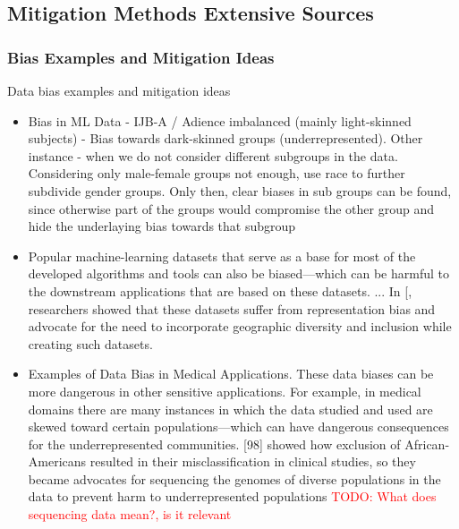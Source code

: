 \documentclass[12pt, a4paper, oneside]{book}   	%
\renewcommand{\todo}[1]{\textcolor{red}{TODO: #1}}
\renewcommand{\paragraph}[1]{%
	\subsubsection*{#1}%
}
\newif\ifrawcitationactive
\newcommand{\rawcitationstart}{
	\color{purple}\rawcitationactivetrue
}
\newcommand{\rawcitationusedstart}{\color{violet}}
\newcommand{\rawcitationusedend}{%
	\ifrawcitationactive
	\color{purple}  %
	\else
	\color{black}  %
	\fi
}
\begin{document}
			
		\rawcitationstart
		\subsection{Mitigation Methods Extensive Sources}
			
			\paragraph{Bias Examples and Mitigation Ideas}
			Data bias examples and mitigation ideas
			\begin{itemize}
				\item Bias in ML Data - \autocite{M24_Buolamwini_2018} IJB-A / Adience imbalanced (mainly light-skinned subjects) - Bias towards dark-skinned groups (underrepresented). Other instance - when we do not consider different subgroups in the data. Considering only male-female groups not enough, use race to further subdivide gender groups. Only then, clear biases in sub groups can be found, since otherwise part of the groups would  compromise the other group and hide the underlaying bias towards that subgroup \autocite{Mehrabi_2021}
				\rawcitationusedstart
				\item Popular machine-learning datasets that serve as a base for most of the developed algorithms and tools can also be biased—which can be harmful to the downstream applications that are based on these datasets. ... In [\autocite{M142_Shankar_2017}, researchers showed that these datasets suffer from representation bias and advocate for the need to incorporate geographic diversity and inclusion while creating such datasets. \autocite{Mehrabi_2021}
				\rawcitationusedend
				\item Examples of Data Bias in Medical Applications. These data biases can be more dangerous in other sensitive applications. For example, in medical domains there are many instances in which the data studied and used are skewed toward certain populations—which can have dangerous consequences for the underrepresented communities. [98] showed how exclusion of African-Americans resulted in their misclassification in clinical studies, so they became advocates for sequencing the genomes of diverse populations in the data to prevent harm to underrepresented populations \autocite{Mehrabi_2021} \todo{What does sequencing data mean?, is it relevant}
			\end{itemize}
			
\end{document}
